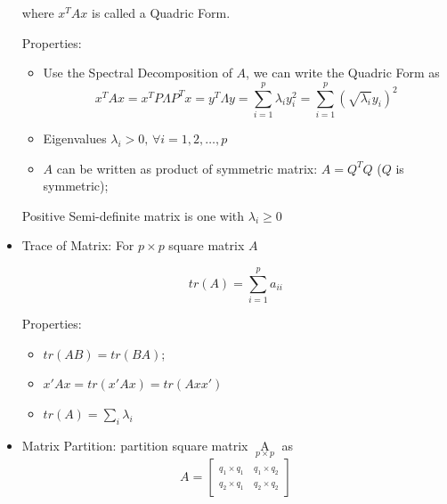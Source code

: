 \begin{itemize}[topsep=6pt,itemsep=4pt]
        where $ x^TAx $ is called a Quadric Form.

        Properties:
        \begin{itemize}[topsep=6pt,itemsep=4pt]
            \item Use the Spectral Decomposition of $ A $, we can write the Quadric Form as
            \begin{equation}
                x^TAx=x^TP\Lambda P^Tx=y^T\Lambda y=\sum_{i=1}^p\lambda_iy_i^2=\sum_{i=1}^p(\sqrt{\lambda_i}y_i)^2 
            \end{equation}
            
            
            \item Eigenvalues $ \lambda _i>0,\,\forall i=1,2,\ldots,p $
            \item $ A $ can be written as product of symmetric matrix: $ A= Q^TQ$ ($ Q $ is symmetric);
        \end{itemize}

        Positive Semi-definite matrix is one with $ \lambda_i\geq 0 $

        \item Trace of Matrix: For $ p\times p $ square matrix $ A $
            
            \begin{equation}
                tr(A) =\sum_{i=1}^p a_{ii}
            \end{equation}
            
            Properties:
            \begin{itemize}[topsep=2pt,itemsep=2pt]
                \item $ tr(AB)=tr(BA)  $;
                \item $ x'Ax=tr(x'Ax)=tr(Axx') $
                \item $ tr(A)=\sum_i \lambda _i $
            \end{itemize}
            
                
        \item Matrix Partition: partition square matrix $ \mathop{A}\limits_{p\times p} $ as 
        \begin{equation}
            A=         
            \begin{bmatrix}
                \mathop{A_{11} }\limits_{q_1\times q_1}&\mathop{A_{12} }\limits_{q_1\times q_2} \\
                \mathop{A_{21} }\limits_{q_2\times q_1}&\mathop{A_{22} }\limits_{q_2\times q_2}   
            \end{bmatrix}   
        \end{equation}


\end{itemize}
